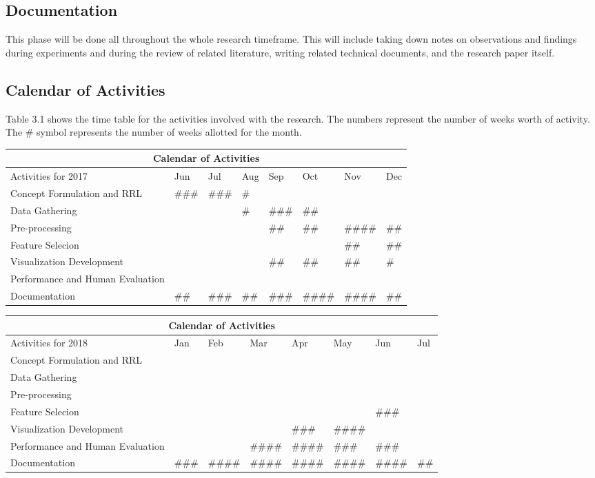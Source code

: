 \subsection{Documentation}
This phase will be done all throughout the whole research timeframe. This will include taking down notes on observations and findings during experiments and during the review of related literature, writing related technical documents, and the research paper itself.


\subsection{Calendar of Activities}
Table 3.1 shows the time table for the activities involved with the research. The numbers represent the number of weeks worth of activity. The \# symbol represents the number of weeks allotted for the month.

\begin{center}
\begin{tabular}{ |p{3.7cm}|p{1.2cm}|p{1.2cm}|p{1.2cm}|p{1.2cm}|p{1.2cm}|p{1.2cm}|p{1.2cm}| }
 \hline
 \multicolumn{8}{|c|}{Calendar of Activities} \\
 \hline
 Activities for 2017& Jun&Jul&Aug&Sep&Oct&Nov&Dec\\
 \hline
Concept Formulation and RRL&\#\#\#& \#\#\# &\#&&&&
 \\
\hline
Data Gathering&&&\#&\#\#\#&\#\#&&
 \\
\hline
Pre-processing&&&&\#\#&\#\#&\#\#\#\#&\#\#
 \\
 \hline
Feature Selecion&&&&&&\#\#&\#\#
 \\
 \hline
Visualization Development&&&&\#\#&\#\#&\#\#&\#
 \\
 \hline
Performance and Human Evaluation&&&&&&&
 \\
 \hline
Documentation&\#\#&\#\#\#& \#\#&\#\#\#&\#\#\#\#&\#\#\#\#&\#\#
 \\
 \hline
\end{tabular}
\end{center}

\begin{center}
\begin{tabular}{ |p{3.7cm}|p{1.2cm}|p{1.2cm}|p{1.2cm}|p{1.2cm}|p{1.2cm}|p{1.2cm}|p{1.2cm}| }
 \hline
 \multicolumn{8}{|c|}{Calendar of Activities} \\
 \hline
 Activities for 2018& Jan&Feb&Mar&Apr&May&Jun&Jul\\
 \hline
Concept Formulation and RRL&&&&&&&
 \\
\hline
Data Gathering&&&&&&&
 \\
\hline
Pre-processing&&&&&&&    
 \\
 \hline
Feature Selecion&&&&&&\#\#\#&    
 \\
 \hline
Visualization Development&&&&\#\#\#& \#\#\#\#&& 
 \\
 \hline
Performance and Human Evaluation&&&\#\#\#\#&\#\#\#\#&\#\#\#&\#\#\#&
 \\
 \hline
Documentation&\#\#\#&\#\#\#\#&\#\#\#\#&\#\#\#\#&\#\#\#\#&\#\#\#\#&\#\#
 \\
 \hline
\end{tabular}
\end{center}

\nocite{Dubnov}
\nocite{Azcarraga2016}
\nocite{cambouropoulosEmilios}
\nocite{3dsom}
\nocite{correa}
\nocite{imogen}
\nocite{libin}
\nocite{foote}
\nocite{silla}
\nocite{mcfee}
\nocite{hepokoski}